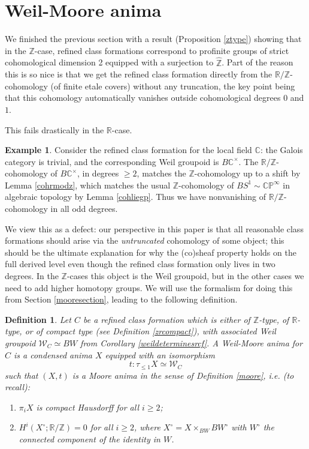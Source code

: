 \documentclass[12pt]{article}
\newtheorem{definition}[theorem]{Definition}
\theoremstyle{definition}
\newtheorem{example}[theorem]{Example}
\newcommand{\mc}{\mathcal}
\newcommand{\mbb}{\mathbb}
\newcommand{\wh}{\widehat}
\begin{document}
\section{Weil-Moore anima}

We finished the previous section with a result (Proposition \ref{ztype}) showing that in the $\mbb{Z}$-case, refined class formations correspond to profinite groups of strict cohomological dimension 2 equipped with a surjection to $\wh{\mbb{Z}}$.  Part of the reason this is so nice is that we get the refined class formation directly from the $\mbb{R}/\mbb{Z}$-cohomology (of finite etale covers) without any truncation, the key point being that this cohomology automatically vanishes outside cohomological degrees $0$ and $1$.

This fails drastically in the $\mbb{R}$-case.

\begin{example}
Consider the refined class formation for the local field $\mbb{C}$: the Galois category is trivial, and the corresponding Weil groupoid is $B\mbb{C}^\times$.  The $\mbb{R}/\mbb{Z}$-cohomology of $B\mbb{C}^\times$, in degrees $\geq 2$, matches the $\mbb{Z}$-cohomology up to a shift by Lemma \ref{cohrmodz}, which matches the usual $\mbb{Z}$-cohomology of $BS^1\sim \mbb{C}\mbb{P}^\infty$ in algebraic topology by Lemma \ref{cohliegp}.  Thus we have nonvanishing of $\mbb{R}/\mbb{Z}$-cohomology in all odd degrees.
\end{example}

We view this as a defect: our perspective in this paper is that all reasonable class formations should arise via the \emph{untruncated} cohomology of some object; this should be the ultimate explanation for why the (co)sheaf property holds on the full derived level even though the refined class formation only lives in two degrees.  In the $\mbb{Z}$-cases this object is the Weil groupoid, but in the other cases we need to add higher homotopy groups.  We will use the formalism for doing this from Section \ref{mooresection}, leading to the following definition.

\begin{definition}
Let $C$ be a refined class formation which is either of $\mbb{Z}$-type, of $\mbb{R}$-type, or of compact type (see Definition \ref{zrcompact}), with associated Weil groupoid $\mc{W}_C\simeq BW$ from Corollary \ref{weildeterminesrcf}.  A \emph{Weil-Moore} anima for $C$ is a condensed anima $X$ equipped with an isomorphism
$$t:\tau_{\leq 1}X\simeq \mc{W}_C$$
such that $(X,t)$ is a Moore anima in the sense of Definition \ref{moore}, i.e. (to recall):
\begin{enumerate}
\item $\pi_iX$ is compact Hausdorff for all $i\geq 2$;
\item $H^i(X^\circ;\mbb{R}/\mbb{Z})=0$ for all $i\geq 2$, where $X^\circ = X\times_{BW}BW^\circ$ with $W^\circ$ the connected component of the identity in $W$.
\end{enumerate}
\end{definition}
\end{document}
